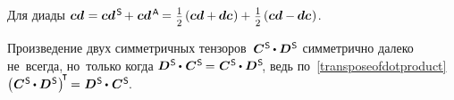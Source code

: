 \begin{otherlanguage}{russian}
\noindent Для диады ${\bm{c}\bm{d} \hspace{.1ex} = \bm{c}\bm{d}^{\mathsf{\hspace{.25ex}S}} \hspace{-0.2ex} + \hspace{.1ex} \bm{c}\bm{d}^{\mathsf{\hspace{.25ex}A}} \hspace{-0.16ex} = \hspace{.1ex}
\smalldisplaystyleonehalf \hspace{-0.1ex} \left( \bm{c}\bm{d} + \hspace{-0.1ex} \bm{d}\bm{c} \hspace{0.1ex} \right)
+ \hspace{.16ex} \smalldisplaystyleonehalf \hspace{-0.1ex} \left( \bm{c} \bm{d} - \hspace{-0.1ex} \bm{d} \bm{c} \hspace{.1ex} \right)}$.

Произведение двух симметричных тензоров~${\bm{C}^{\mathsf{\hspace{0.1ex}S}} \hspace{-0.1ex}\dotp \bm{D}^{\mathsf{\hspace{0.1ex}S}}}$ симметрично далеко не~всегда, но~только когда ${\bm{D}^{\mathsf{\hspace{0.1ex}S}} \hspace{-0.1ex}\dotp\hspace{0.12ex} \bm{C}^{\mathsf{\hspace{0.1ex}S}} \hspace{-0.2ex}=\hspace{0.1ex} \bm{C}^{\mathsf{\hspace{0.1ex}S}} \hspace{-0.1ex}\dotp \bm{D}^{\mathsf{\hspace{0.1ex}S}}\hspace{-0.4ex}}$,
ведь по~\eqref{transposeofdotproduct} ${\left(\hspace{0.08ex} \bm{C}^{\mathsf{\hspace{0.1ex}S}} \hspace{-0.1ex}\dotp \bm{D}^{\mathsf{\hspace{0.1ex}S}} \hspace{0.1ex}\right)^{\hspace{-0.32ex}\T} \hspace{-0.16ex} = \hspace{0.1ex} \bm{D}^{\mathsf{\hspace{0.1ex}S}} \hspace{-0.1ex}\dotp\hspace{0.12ex} \bm{C}^{\mathsf{\hspace{0.1ex}S}} \hspace{-0.4ex}}$.


\end{otherlanguage}
